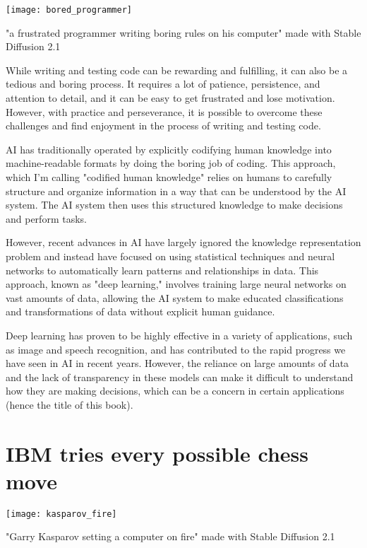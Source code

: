 \begin{marginfigure}[-5.5cm]
        \texttt{[image: bored\_programmer]}
        \caption{"a frustrated programmer writing boring rules on his computer" made with Stable Diffusion 2.1}
\end{marginfigure}

While writing and testing code can be rewarding and fulfilling, it can also be a tedious and boring process. It requires a lot of patience, persistence, and attention to detail, and it can be easy to get frustrated and lose motivation. However, with practice and perseverance, it is possible to overcome these challenges and find enjoyment in the process of writing and testing code.

AI has traditionally operated by explicitly codifying human knowledge into machine-readable formats by doing the boring job of coding. This approach, which I'm calling "codified human knowledge" relies on humans to carefully structure and organize information in a way that can be understood by the AI system. The AI system then uses this structured knowledge to make decisions and perform tasks.

However, recent advances in AI have largely ignored the knowledge representation problem and instead have focused on using statistical techniques and neural networks to automatically learn patterns and relationships in data. This approach, known as "deep learning," involves training large neural networks on vast amounts of data, allowing the AI system to make educated classifications and transformations of data without explicit human guidance.

Deep learning has proven to be highly effective in a variety of applications, such as image and speech recognition, and has contributed to the rapid progress we have seen in AI in recent years. However, the reliance on large amounts of data and the lack of transparency in these models can make it difficult to understand how they are making decisions, which can be a concern in certain applications (hence the title of this book).

\section{IBM tries every possible chess move}

\begin{marginfigure}[-5.5cm]
        \texttt{[image: kasparov\_fire]}
	\caption{"Garry Kasparov setting a computer on fire" made with Stable Diffusion 2.1}
\end{marginfigure}

